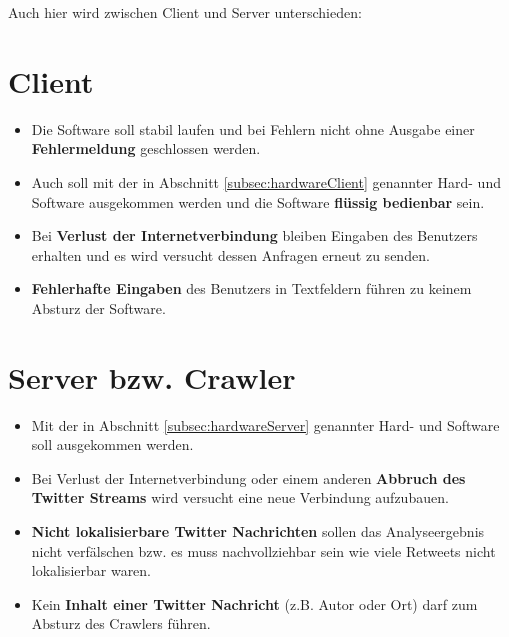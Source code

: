 Auch hier wird zwischen Client und Server unterschieden:
\section{Client}
\begin{itemize}
	\item Die Software soll stabil laufen und bei Fehlern nicht ohne Ausgabe einer \textbf{Fehlermeldung} geschlossen werden.
	\item Auch soll mit der in Abschnitt \ref{subsec:hardwareClient} genannter Hard- und Software ausgekommen werden und die Software \textbf{flüssig bedienbar} sein.
	\item Bei \textbf{Verlust der Internetverbindung} bleiben Eingaben des Benutzers erhalten und es wird versucht dessen Anfragen erneut zu senden.
	\item \textbf{Fehlerhafte Eingaben} des Benutzers in Textfeldern führen zu keinem Absturz der Software.
\end{itemize}
\section{Server bzw. Crawler}
\begin{itemize}
	\item Mit der in Abschnitt \ref{subsec:hardwareServer} genannter Hard- und Software soll ausgekommen werden.
	\item Bei Verlust der Internetverbindung oder einem anderen \textbf{Abbruch des Twitter Streams} wird versucht eine neue Verbindung aufzubauen.
	\item \textbf{Nicht lokalisierbare Twitter Nachrichten} sollen das Analyseergebnis nicht verfälschen bzw. es muss nachvollziehbar sein wie viele Retweets nicht lokalisierbar waren.
	\item Kein \textbf{Inhalt einer Twitter Nachricht} (z.B. Autor oder Ort) darf zum Absturz des Crawlers führen.
\end{itemize}
